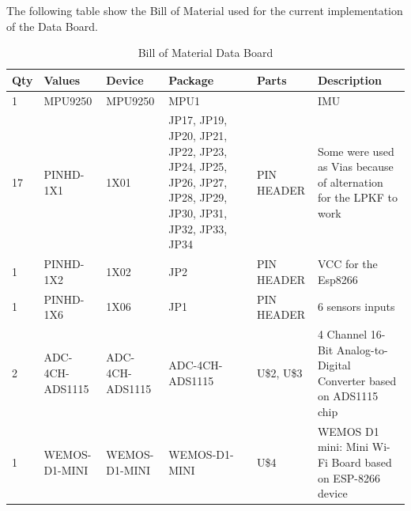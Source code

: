 \documentclass[12 pt, a4paper]{thesis}
\begin{document}
The following table show the Bill of Material used for the current implementation of the Data Board.
\begin{table}[hbt!]
\begin{center}
\begin{tabular}{| m{0.3cm} | m{1.5cm} | m{2.2cm} | m{2.6cm} | m{2.4cm} | m{3cm} |}
\hline
Qty & Values & Device & Package & Parts & Description\\
\hline
1  & MPU9250   & MPU9250 & MPU1 & & IMU \\
\hline 
17 & PINHD-1X1 & 1X01   & JP17, JP19, JP20, JP21, JP22, JP23, JP24, JP25, JP26, JP27, JP28, JP29, JP30, JP31, JP32, JP33, JP34 & PIN HEADER & Some were used as Vias because of alternation for the LPKF to work\\
\hline
1    & PINHD-1X2 & 1X02 & JP2 & PIN HEADER & VCC for the Esp8266\\
\hline
1    & PINHD-1X6 & 1X06 & JP1 & PIN HEADER & 6 sensors inputs\\
\hline 
2    & ADC-4CH-ADS1115 & ADC-4CH-ADS1115 & ADC-4CH-ADS1115 & U\$2, U\$3 & 4 Channel 16-Bit Analog-to-Digital Converter based on ADS1115 chip\\
\hline 
1    & WEMOS-D1-MINI & WEMOS-D1-MINI & WEMOS-D1-MINI & U\$4 & WEMOS D1 mini: Mini Wi-Fi Board based on ESP-8266 device \\
\hline
\end{tabular}
\end{center}
\caption{Bill of Material Data Board}
\end{table}
\end{document}
